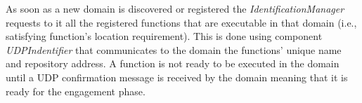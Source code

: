 


As soon as a new domain is discovered or registered the \textit{IdentificationManager} requests to it all the registered functions that are executable in that domain (i.e., satisfying function's location requirement). This is done using component \textit{UDPIndentifier} that communicates  to the domain the functions' unique name and repository address. A function is not ready to be executed in the domain until a UDP confirmation message is received by the domain meaning that it is ready for the engagement phase. 




